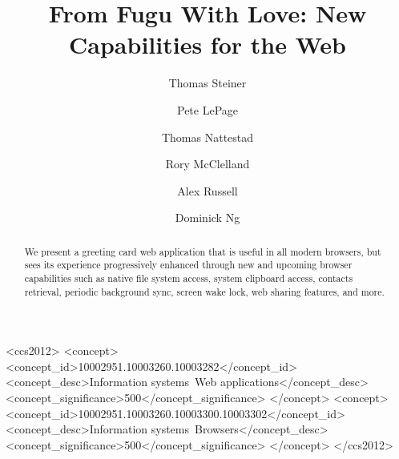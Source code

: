 \documentclass[sigconf]{acmart}
\begin{document}
\title{From Fugu With Love: New Capabilities for the Web}

\author{Thomas Steiner}

\author{Pete LePage}

\author{Thomas Nattestad}
\author{Rory McClelland}

\author{Alex Russell}

\author{Dominick Ng}

\renewcommand{\shortauthors}{Thomas Steiner, Pete LePage, Thomas Nattestad, \textit{et al.}}

\begin{abstract}
We present a greeting card web application that is useful in all modern browsers,
but sees its experience progressively enhanced through new and upcoming browser capabilities
such as native file system access, system clipboard access, contacts retrieval,
periodic background sync, screen wake lock, web sharing features, and more.
\end{abstract}

\begin{CCSXML}
<ccs2012>
<concept>
<concept_id>10002951.10003260.10003282</concept_id>
<concept_desc>Information systems~Web applications</concept_desc>
<concept_significance>500</concept_significance>
</concept>
<concept>
<concept_id>10002951.10003260.10003300.10003302</concept_id>
<concept_desc>Information systems~Browsers</concept_desc>
<concept_significance>500</concept_significance>
</concept>
</ccs2012>
\end{CCSXML}

\end{document}
